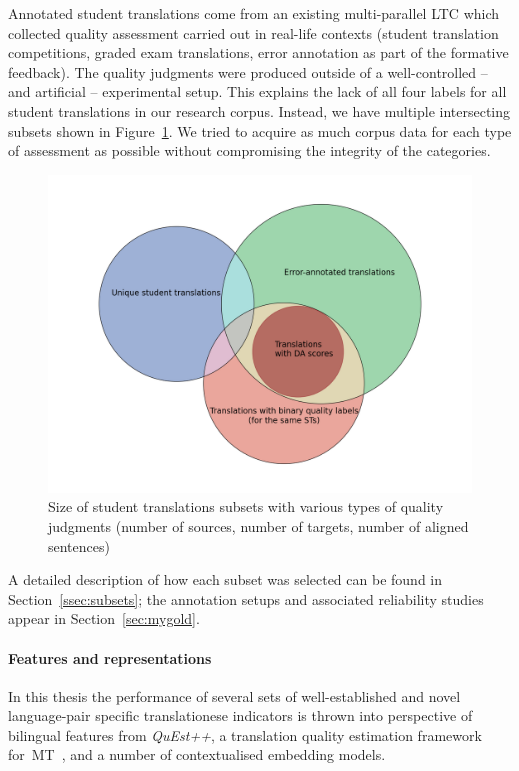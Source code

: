 Annotated student translations come from an existing multi-parallel \gls{LTC} which collected quality assessment carried out in real-life contexts (student translation competitions, graded exam translations, error annotation as part of the formative feedback). The quality judgments were produced outside of a well-controlled -- and artificial -- experimental setup.
This explains the lack of all four labels for all student translations in our research corpus. Instead, we have multiple intersecting subsets shown in Figure~\ref{fig:subsets}. We tried to acquire as much corpus data for each type of assessment as possible without compromising the integrity of the categories.
\label{pg:subsets}
\begin{figure}[h ] %
	\centering
	\includegraphics[scale=0.5]{figures/subsets}
	\caption{Size of student translations subsets with various types of quality judgments (number of sources, number of targets, number of aligned sentences)}
	\label{fig:subsets}
\end{figure}


A detailed description of how each subset was selected can be found in Section~\ref{ssec:subsets}; the annotation setups and associated reliability studies appear in Section~\ref{sec:mygold}. 

\paragraph{Features and representations} In this thesis the performance of several sets of well-established and novel language-pair specific translationese indicators is thrown into perspective of bilingual features from \textit{QuEst++}, a translation quality estimation framework for~\gls*{MT}~\cite{Specia2015quest}, and a number of contextualised embedding models.


